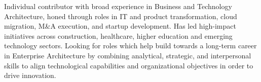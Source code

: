 

\begin{cvparagraph}

Individual contributor with broad experience in Business and Technology Architecture, honed through roles in IT and product transformation, cloud migration, M\&A execution, and startup development. Has led high-impact initiatives across construction, healthcare, higher education and emerging technology sectors. Looking for roles which help build towards a long-term career in Enterprise Architecture by combining analytical, strategic, and interpersonal skills to align technological capabilities and organizational objectives in order to drive innovation.
\end{cvparagraph}